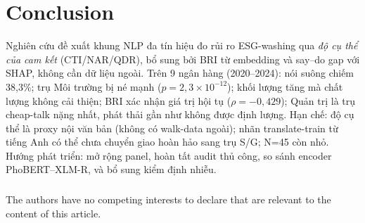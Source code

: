 \documentclass[runningheads]{llncs}
\begin{document}
\section{Conclusion}
Nghiên cứu đề xuất khung NLP đa tín hiệu đo rủi ro ESG-washing qua \emph{độ cụ thể của cam kết} (CTI/NAR/QDR), bổ sung bởi BRI từ embedding và say--do gap với SHAP, không cần dữ liệu ngoài. Trên 9 ngân hàng (2020--2024): nói suông chiếm 38{,}3\%; trụ Môi trường bị né mạnh ($p=2{,}3\times10^{-12}$); khối lượng tăng mà chất lượng không cải thiện; BRI xác nhận giá trị hội tụ ($\rho=-0{,}429$); Quản trị là trụ cheap-talk nặng nhất, phát thải gần như không được định lượng. Hạn chế: độ cụ thể là proxy nội văn bản (không có walk-data ngoài); nhãn translate-train từ tiếng Anh có thể chưa chuyển giao hoàn hảo sang trụ S/G; N=45 còn nhỏ. Hướng phát triển: mở rộng panel, hoàn tất audit thủ công, so sánh encoder PhoBERT--XLM-R, và bổ sung kiểm định nhiễu.

\begin{credits}
\subsubsection{\discintname}
The authors have no competing interests to declare that are relevant to the content of this article.
\end{credits}

%


\end{document}
